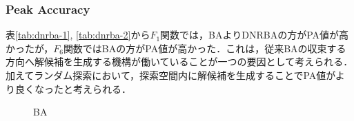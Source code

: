 \documentclass[a4j,11pt]{jarticle}
\begin{document}
\subsubsection{Peak Accuracy}
表\ref{tab:dnrba-1}, \ref{tab:dnrba-2}から$F_1$関数では，BAよりDNRBAの方がPA値が高かったが，$F_6$関数ではBAの方がPA値が高かった．これは，従来BAの収束する方向へ解候補を生成する機構が働いていることが一つの要因として考えられる．加えてランダム探索において，探索空間内に解候補を生成することでPA値がより良くなったと考えられる．

\begin{figure}[h]
\centering
{}

\caption{BA}
\label{fig:dnrba-results_ba}
\end{figure}
\end{document}
